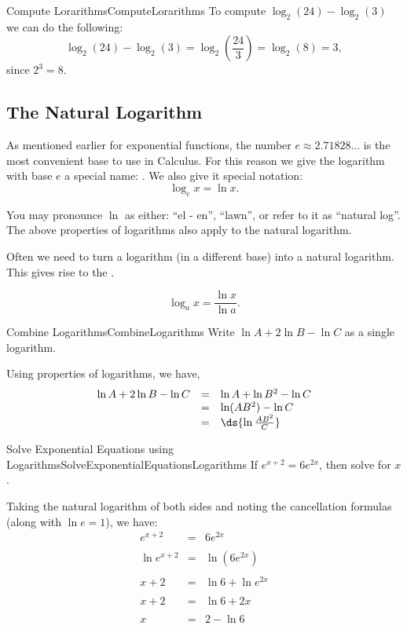 \begin{example}{Compute Lorarithms}{ComputeLorarithms}
To compute $\log_2(24)-\log_2(3)$ we can do the following:
$$\log_2(24)-\log_2(3)=\log_2\left(\frac{24}{3}\right)=\log_2(8)=3,$$
since $2^3=8$.
\end{example}

\subsection*{The Natural Logarithm}
As mentioned earlier for exponential functions, the number $e\approx 2.71828\ldots$ 
is the most convenient base to use in Calculus.
For this reason we give the logarithm with base $e$ a special name: .
We also give it special notation:
$$\log_ex=\ln x.$$

You may pronounce $\ln$ as either: ``el - en'', ``lawn'', or refer to it as ``natural log''.
The above properties of logarithms also apply to the natural logarithm.
 
Often we need to turn a logarithm (in a different base) into a natural logarithm.
This gives rise to the .

\begin{formulabox}
$$\log_ax=\frac{\ln x}{\ln a}.$$
\end{formulabox}

\begin{example}{Combine Logarithms}{CombineLogarithms}
Write $\ln A+2\ln B -\ln C$ as a single logarithm.
\end{example}

\begin{solution} 
Using properties of logarithms, we have,
$$\begin{array}{rcl}
\ln A+2\ln B -\ln C & = & \ln A + \ln B^2 - \ln C\\
~&=& \ln (AB^2) - \ln C\\
~&=& \ds{\ln\frac{AB^2}{C}}\\
\end{array}$$
\end{solution}

\begin{example}{Solve Exponential Equations using Logarithms}{SolveExponentialEquationsLogarithms}
If $e^{x+2}=6e^{2x}$, then solve for $x$.
\end{example}

\begin{solution} 
Taking the natural logarithm of both sides and noting the cancellation formulas (along with $\ln e=1$), we have:
$$\begin{array}{rcl}
e^{x+2} & = & 6e^{2x}\\
\\
\ln e^{x+2}&=& \ln (6e^{2x})\\
\\
x+2&=& \ln 6 + \ln e^{2x}\\
\\
x+2&=& \ln 6 + 2x\\
\\
x&=& 2-\ln 6\\
\end{array}$$
\end{solution}

